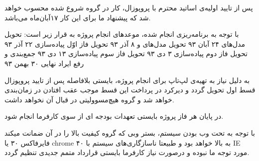 پس از تایید اولیه‌ی اساتید محترم با پروپوزال، کار در گروه شروع شده محسوب خواهد شد که پیشنهاد ما برای این کار ۱۷آبان‌ماه می‌باشد.

با توجه به برنامه‌ریزی انجام شده، موعدهای انجام پروژه به قرار زیر است:
 تحویل مدل‌های  \hfill ۲۴ آبان ۹۳
 تحویل مدل‌های  و  \hfill ۸ آذر ۹۳
 تحویل فاز اوّل پیاده‌سازی  \hfill ۲۲ آذر ۹۳
 تحویل فاز دوم پیاده‌سازی  \hfill ۳ دی ۹۳
 تحویل فاز سوم پیاده‌سازی  \hfill ۱۳ دی ۹۳
 جمع‌بندی و رفع ایراد نهایی  \hfill ۳۰ بهمن ۹۳ 

به دلیل نیاز به تهیه‌ی لپ‌تاپ‌ برای انجام پروژه، بایستی بلافاصله پس از تایید پروپوزال قسط اول تحویل گردد و دیرکرد در پرداخت این قسط موجب عقب افتادن در زمان‌بندی خواهد شد و گروه هیچ‌مسوولیتی در قبال آن‌ نخواهد داشت.

 در پایان هر فاز پروژه بایستی تعهدات بودجه ای از سوی کارفرما انجام شود.


 با توجه به تحت وب بودن سیستم، بستر وبی که گروه کیفیت بالا را در آن ضمانت میکند فایرفاکس ۳۰ یا chrome ۴۰ به بالا خواهد بود و طبیعتا ناسازگاری‌های سیستم با IE مورد توجه ما نبوده و درصورت نیاز کارفرما بایستی قرارداد متمم جدیدی تنظیم گردد.
